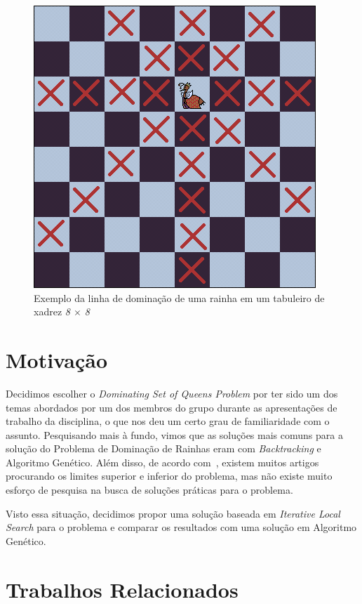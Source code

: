 \documentclass[
	article,			%
	11pt,				%
	oneside,			%
	a4paper,			%
	english,			%
	brazil,				%
	sumario=tradicional
	]{abntex2}
\begin{document}
  \begin{figure}
    \centering
    \includegraphics[width=0.60\linewidth]{dom1rainha8x8.png}
    \caption{Exemplo da linha de dominação de uma rainha em um tabuleiro de xadrez \textit{8 $\times$ 8}}
    \label{fig:1rainha}
  \end{figure}

\section{Motivação}

Decidimos escolher o \textit{Dominating Set of Queens Problem} por ter sido um dos temas abordados por um dos membros do grupo durante as apresentações de trabalho da disciplina, o que nos deu um certo grau de familiaridade com o assunto. Pesquisando mais à fundo, vimos que as soluções mais comuns para a solução do Problema de Dominação de Rainhas eram com \textit{Backtracking} e Algoritmo Genético. Além disso, de acordo com~\cite{alharbi2017genetic}, existem muitos artigos procurando os limites superior e inferior do problema, mas não existe muito esforço de pesquisa
na busca de soluções práticas para o problema.

Visto essa situação, decidimos propor uma solução baseada em \textit{Iterative Local Search} para o problema e comparar os resultados com uma solução em Algoritmo Genético.

\section{Trabalhos Relacionados}
\end{document}
